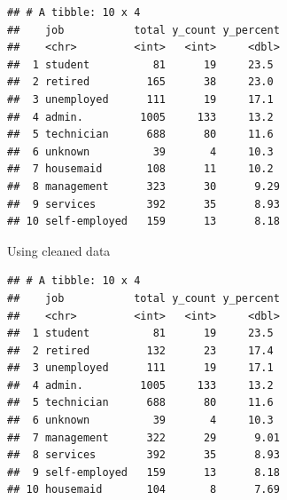 \documentclass[
]{article}
\newenvironment{Shaded}{\begin{snugshade}}{\end{snugshade}}
\newcommand{\AttributeTok}[1]{\textcolor[rgb]{0.13,0.29,0.53}{#1}}
\newcommand{\ConstantTok}[1]{\textcolor[rgb]{0.56,0.35,0.01}{#1}}
\newcommand{\DecValTok}[1]{\textcolor[rgb]{0.00,0.00,0.81}{#1}}
\newcommand{\FunctionTok}[1]{\textcolor[rgb]{0.13,0.29,0.53}{\textbf{#1}}}
\newcommand{\NormalTok}[1]{#1}
\newcommand{\OtherTok}[1]{\textcolor[rgb]{0.56,0.35,0.01}{#1}}
\newcommand{\SpecialCharTok}[1]{\textcolor[rgb]{0.81,0.36,0.00}{\textbf{#1}}}
\newcommand{\StringTok}[1]{\textcolor[rgb]{0.31,0.60,0.02}{#1}}
\begin{document}
\begin{verbatim}
## # A tibble: 10 x 4
##    job           total y_count y_percent
##    <chr>         <int>   <int>     <dbl>
##  1 student          81      19     23.5 
##  2 retired         165      38     23.0 
##  3 unemployed      111      19     17.1 
##  4 admin.         1005     133     13.2 
##  5 technician      688      80     11.6 
##  6 unknown          39       4     10.3 
##  7 housemaid       108      11     10.2 
##  8 management      323      30      9.29
##  9 services        392      35      8.93
## 10 self-employed   159      13      8.18
\end{verbatim}

Using cleaned data

\begin{Shaded}
\end{Shaded}

\begin{verbatim}
## # A tibble: 10 x 4
##    job           total y_count y_percent
##    <chr>         <int>   <int>     <dbl>
##  1 student          81      19     23.5 
##  2 retired         132      23     17.4 
##  3 unemployed      111      19     17.1 
##  4 admin.         1005     133     13.2 
##  5 technician      688      80     11.6 
##  6 unknown          39       4     10.3 
##  7 management      322      29      9.01
##  8 services        392      35      8.93
##  9 self-employed   159      13      8.18
## 10 housemaid       104       8      7.69
\end{verbatim}
\end{document}

